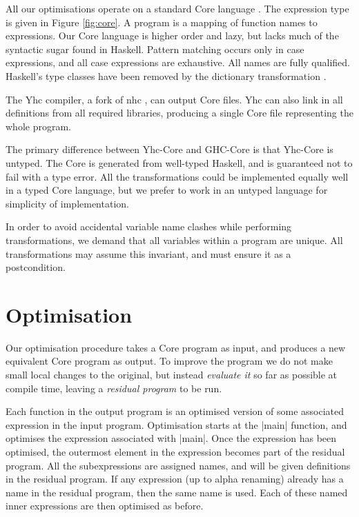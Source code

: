 \documentclass{llncs}
\begin{document}
All our optimisations operate on a standard Core language \cite{me:yhc_core}. The expression type is given in Figure \ref{fig:core}. A program is a mapping of function names to expressions. Our Core language is higher order and lazy, but lacks much of the syntactic sugar found in Haskell. Pattern matching occurs only in case expressions, and all case expressions are exhaustive. All names are fully qualified. Haskell's type classes have been removed by the dictionary transformation \cite{wadler:type_classes}.

The Yhc compiler, a fork of nhc \cite{nhc}, can output Core files. Yhc can also link in all definitions from all required libraries, producing a single Core file representing the whole program.

The primary difference between Yhc-Core and GHC-Core \cite{ghc_core} is that Yhc-Core is untyped. The Core is generated from well-typed Haskell, and is guaranteed not to fail with a type error. All the transformations could be implemented equally well in a typed Core language, but we prefer to work in an untyped language for simplicity of implementation.

In order to avoid accidental variable name clashes while performing transformations, we demand that all variables within a program are unique. All transformations may assume this invariant, and must ensure it as a postcondition.

\section{Optimisation}
\label{sec:optimisation}

Our optimisation procedure takes a Core program as input, and produces a new equivalent Core program as output. To improve the program we do not make small local changes to the original, but instead \textit{evaluate it} so far as possible at compile time, leaving a \textit{residual program} to be run.

Each function in the output program is an optimised version of some associated expression in the input program. Optimisation starts at the |main| function, and optimises the expression associated with |main|. Once the expression has been optimised, the outermost element in the expression becomes part of the residual program. All the subexpressions are assigned names, and will be given definitions in the residual program. If any expression (up to alpha renaming) already has a name in the residual program, then the same name is used. Each of these named inner expressions are then optimised as before.
\end{document}
